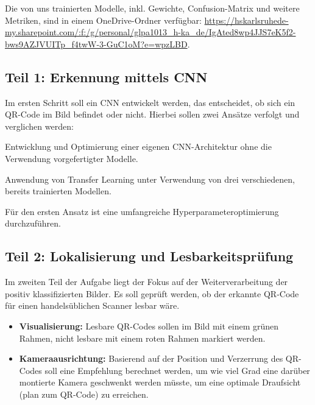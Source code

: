 Die von uns trainierten Modelle, inkl. Gewichte, Confusion-Matrix und weitere Metriken, sind in einem OneDrive-Ordner verfügbar: \url{https://hskarlsruhede-my.sharepoint.com/:f:/g/personal/glpa1013_h-ka_de/IgAted8wp4JJS7eK5f2-bws9AZJVUITp_f4twW-3-GuC1oM?e=wpzLBD}.

\newpage

\subsection{Teil 1: Erkennung mittels CNN}
Im ersten Schritt soll ein \ac{CNN} entwickelt werden, das entscheidet, ob sich ein \ac{QR}-Code im Bild befindet oder nicht. Hierbei sollen zwei Ansätze verfolgt und verglichen werden:
\begin{listNorm}
    \item Entwicklung und Optimierung einer eigenen \ac{CNN}-Architektur ohne die Verwendung vorgefertigter Modelle.
    \item Anwendung von Transfer Learning unter Verwendung von drei verschiedenen, bereits trainierten Modellen.
\end{listNorm}
Für den ersten Ansatz ist eine umfangreiche Hyperparameteroptimierung durchzuführen.

\subsection{Teil 2: Lokalisierung und Lesbarkeitsprüfung}
Im zweiten Teil der Aufgabe liegt der Fokus auf der Weiterverarbeitung der positiv klassifizierten Bilder. Es soll geprüft werden, ob der erkannte \ac{QR}-Code für einen handelsüblichen Scanner lesbar wäre.
\begin{itemize}
    \item \textbf{Visualisierung:} Lesbare \ac{QR}-Codes sollen im Bild mit einem grünen Rahmen, nicht lesbare mit einem roten Rahmen markiert werden.
    \item \textbf{Kameraausrichtung:} Basierend auf der Position und Verzerrung des \ac{QR}-Codes soll eine Empfehlung berechnet werden, um wie viel Grad eine darüber montierte Kamera geschwenkt werden müsste, um eine optimale Draufsicht (plan zum \ac{QR}-Code) zu erreichen.
\end{itemize}
